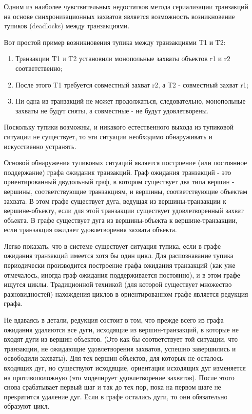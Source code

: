 Одним из наиболее чувствительных недостатков метода сериализации транзакций на основе синхронизационных захватов является возможность возникновение тупиков (deadlocks) между транзакциями.

Вот простой пример возникновения тупика между транзакциями T1 и T2:
\begin{enumerate}
    \item Транзакции T1 и T2 установили монопольные захваты объектов r1 и r2 соответственно;
    \item После этого T1 требуется совместный захват r2, а T2 - совместный захват r1;
    \item Ни одна из транзакций не может продолжаться, следовательно, монопольные захваты не будут сняты, а совместные - не будут удовлетворены.
\end{enumerate}

Поскольку тупики возможны, и никакого естественного выхода из тупиковой ситуации не существует, то эти ситуации необходимо обнаруживать и искусственно устранять.

Основой обнаружения тупиковых ситуаций является построение (или постоянное поддержание) графа ожидания транзакций. Граф ожидания транзакций - это ориентированный двудольный граф, в котором существует два типа вершин - вершины, соответствующие транзакциям, и вершины, соответствующие объектам захвата. В этом графе существует дуга, ведущая из вершины-транзакции к вершине-объекту, если для этой транзакции существует удовлетворенный захват объекта. В графе существует дуга из вершины-объекта к вершине-транзакции, если транзакция ожидает удовлетворения захвата объекта.


Легко показать, что в системе существует ситуация тупика, если в графе ожидания транзакций имеется хотя бы один цикл. Для распознавание тупика периодически производится построение графа ожидания транзакций (как уже отмечалось, иногда граф ожидания поддерживается постоянно), и в этом графе ищутся циклы. Традиционной техникой (для которой существует множество разновидностей) нахождения циклов в ориентированном графе является редукция графа.


Не вдаваясь в детали, редукция состоит в том, что прежде всего из графа ожидания удаляются все дуги, исходящие из вершин-транзакций, в которые не входят дуги из вершин-объектов. (Это как бы соответствует той ситуации, что транзакции, не ожидающие удовлетворения захватов, успешно завершились и освободили захваты). Для тех вершин-объектов, для которых не осталось входящих дуг, но существуют исходящие, ориентация исходящих дуг изменяется на противоположную (это моделирует удовлетворение захватов). После этого снова срабатывает первый шаг и так до тех пор, пока на первом шаге не прекратится удаление дуг. Если в графе остались дуги, то они обязательно образуют цикл.


